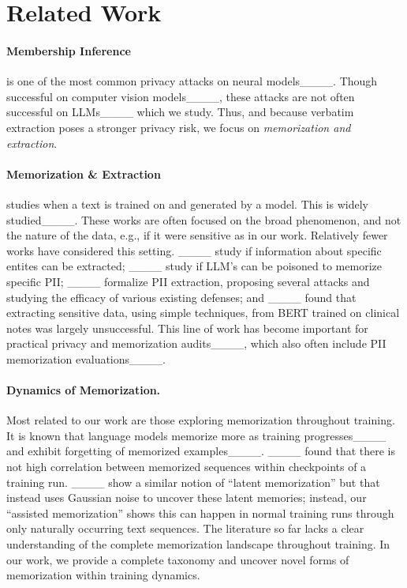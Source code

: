 \section{Related Work}
\paragraph{Membership Inference}
is one of the most common privacy attacks on neural models____. Though successful on computer vision models____, these attacks are not often successful on LLMs____ which we study. Thus, and because verbatim extraction poses a stronger privacy risk, we focus on \emph{memorization and extraction}. 


\paragraph{Memorization \& Extraction}
studies when a text is trained on and generated by a model. This is widely studied____. These works are often focused on the broad phenomenon, and not the nature of the data, e.g., if it were sensitive as in our work. Relatively fewer works have considered this setting. ____ study if information about specific entites can be extracted; ____ study if LLM's can be poisoned to memorize specific PII; ____ formalize PII extraction, proposing several attacks and studying the efficacy of various existing defenses; and ____ found that extracting sensitive data, using simple techniques, from BERT trained on clinical notes was largely unsuccessful. This line of work has become important for practical privacy and memorization audits____, which also often include PII memorization evaluations____. 
\vspace{-1em}

\paragraph{Dynamics of Memorization.} 
Most related to our work are those exploring memorization throughout training. It is known that language models memorize more as training progresses____ and exhibit forgetting of memorized examples____. ____ found that there is not high correlation between memorized sequences within checkpoints of a training run. ____ show a similar notion of ``latent memorization'' but that instead  uses Gaussian noise to uncover these latent memories; instead, our ``assisted memorization'' shows this can happen in normal training runs through only naturally occurring text sequences. The literature so far lacks a clear understanding of the complete memorization landscape throughout training. In our work, we provide a complete taxonomy and uncover novel forms of memorization within training dynamics. 
\vspace{-1em}

